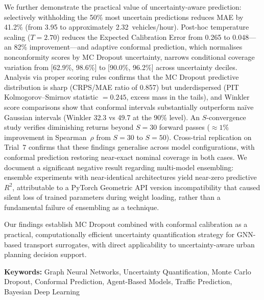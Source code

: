 We further demonstrate the practical value of uncertainty-aware prediction: selectively withholding the 50\% most uncertain predictions reduces MAE by 41.2\% (from 3.95 to approximately 2.32~vehicles/hour). Post-hoc temperature scaling ($T = 2.70$) reduces the Expected Calibration Error from 0.265 to 0.048---an 82\% improvement---and adaptive conformal prediction, which normalises nonconformity scores by MC Dropout uncertainty, narrows conditional coverage variation from [62.9\%, 98.6\%] to [90.0\%, 96.2\%] across uncertainty deciles. Analysis via proper scoring rules confirms that the MC Dropout predictive distribution is sharp (CRPS/MAE ratio of 0.857) but underdispersed (PIT Kolmogorov--Smirnov statistic $= 0.245$, excess mass in the tails), and Winkler score comparisons show that conformal intervals substantially outperform na\"{i}ve Gaussian intervals (Winkler 32.3 vs 49.7 at the 90\% level). An $S$-convergence study verifies diminishing returns beyond $S = 30$ forward passes ($\approx 1\%$ improvement in Spearman~$\rho$ from $S = 30$ to $S = 50$). Cross-trial replication on Trial~7 confirms that these findings generalise across model configurations, with conformal prediction restoring near-exact nominal coverage in both cases. We document a significant negative result regarding multi-model ensembling: ensemble experiments with near-identical architectures yield near-zero predictive $R^2$, attributable to a PyTorch Geometric API version incompatibility that caused silent loss of trained parameters during weight loading, rather than a fundamental failure of ensembling as a technique.

Our findings establish MC Dropout combined with conformal calibration as a practical, computationally efficient uncertainty quantification strategy for GNN-based transport surrogates, with direct applicability to uncertainty-aware urban planning decision support.

\vspace{1cm}
\noindent\textbf{Keywords:} Graph Neural Networks, Uncertainty Quantification, Monte Carlo Dropout, Conformal Prediction, Agent-Based Models, Traffic Prediction, Bayesian Deep Learning
